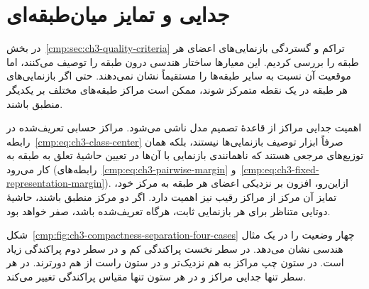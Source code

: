 \section{جدایی و تمایز میان‌طبقه‌ای}
\label{cmp:sec:ch3-center-separation}

در بخش~\ref{cmp:sec:ch3-quality-criteria} تراکم و گستردگی
بازنمایی‌های اعضای هر طبقه را بررسی کردیم. این معیارها
ساختار هندسی درون طبقه را توصیف می‌کنند، اما موقعیت آن
نسبت به سایر طبقه‌ها را مستقیماً نشان نمی‌دهند. حتی اگر
بازنمایی‌های هر طبقه در یک نقطه متمرکز شوند، ممکن است
مراکز طبقه‌های مختلف بر یکدیگر منطبق باشند.

اهمیت جدایی مراکز از قاعدهٔ تصمیم مدل ناشی می‌شود.
مراکز حسابی تعریف‌شده در رابطه~\eqref{cmp:eq:ch3-class-center}
صرفاً ابزار توصیف بازنمایی‌ها نیستند، بلکه همان توزیع‌های
مرجعی هستند که ناهمانندی بازنمایی با آن‌ها در تعیین حاشیهٔ
تعلق به طبقه به کار می‌رود
(رابطه‌های~\eqref{cmp:eq:ch3-pairwise-margin}
و~\eqref{cmp:eq:ch3-fixed-representation-margin}).
ازاین‌رو، افزون بر نزدیکی اعضای هر طبقه به مرکز خود،
تمایز آن مرکز از مراکز رقیب نیز اهمیت دارد. اگر دو
مرکز منطبق باشند، حاشیهٔ دوتایی متناظر برای هر بازنمایی
ثابت، هرگاه تعریف‌شده باشد، صفر خواهد بود.

شکل~\ref{cmp:fig:ch3-compactness-separation-four-cases}
چهار وضعیت را در یک مثال هندسی نشان می‌دهد. در سطر
نخست پراکندگی کم و در سطر دوم پراکندگی زیاد است.
در ستون چپ مراکز به هم نزدیک‌تر و در ستون راست
از هم دورترند. در هر سطر تنها جدایی مراکز و در
هر ستون تنها مقیاس پراکندگی تغییر می‌کند.

